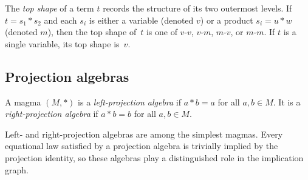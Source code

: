 \begin{definition}\label{def:topshape}
The \emph{top shape} of a term $t$ records the structure of its
two outermost levels.  If $t = s_1 * s_2$ and each $s_i$ is either
a variable (denoted $v$) or a product $s_i = u * w$ (denoted $m$),
then the top shape of~$t$ is one of $v$-$v$, $v$-$m$, $m$-$v$,
or $m$-$m$.  If $t$ is a single variable, its top shape is~$v$.
\end{definition}

\subsection{Projection algebras}

\begin{definition}\label{def:proj-alg}
A magma $(M, *)$ is a \emph{left-projection algebra} if $a * b = a$
for all $a, b \in M$.  It is a \emph{right-projection algebra} if
$a * b = b$ for all $a, b \in M$.
\end{definition}

Left- and right-projection algebras are among the simplest magmas.
Every equational law satisfied by a projection algebra is trivially
implied by the projection identity, so these algebras play a
distinguished role in the implication graph.
